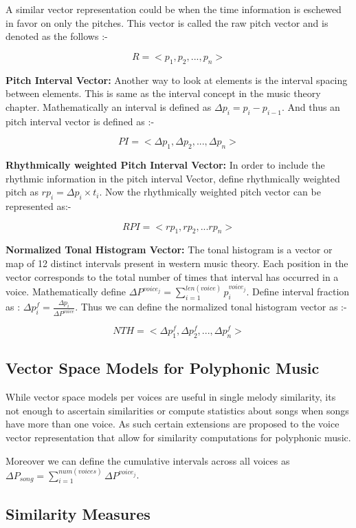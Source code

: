 \noindent A similar vector representation could be when the time information is eschewed in favor on only the pitches. This vector is called the raw pitch vector and is denoted as the follows :-

\begin{equation}
R = <p_1, p_2, ..., p_n>
\end{equation}

\noindent \textbf{Pitch Interval Vector:} Another way to look at elements is the interval spacing between elements. This is same as the interval concept in the music theory chapter. Mathematically an interval is defined as $\Delta p_i = p_i - p_{i-1}$. And thus an pitch interval vector is defined as :-

\begin{equation}
PI = <\Delta p_1, \Delta p_2, ... , \Delta p_n>
\end{equation}

\noindent \textbf{Rhythmically weighted Pitch Interval Vector:} In order to include the rhythmic information in the pitch interval Vector, define rhythmically weighted pitch as $rp_i = \Delta p_i \times t_i$. Now the rhythmically weighted pitch vector can be represented as:-

\begin{equation}
RPI = <rp_1, rp_2, ... rp_n>
\end{equation}

\noindent \textbf{Normalized Tonal Histogram Vector:} The tonal histogram is a vector or map of 12 distinct intervals present in western music theory. Each position in the vector corresponds to the total number of times that interval has occurred in a voice. Mathematically define $\Delta P^{voice_j} = \sum_{i=1}^{len(voice)} p_i^{voice_j}$. Define interval fraction as : $\Delta p^f_i = \frac{\Delta p_i}{\Delta P^{voice}}$. Thus we can define the normalized tonal histogram vector as :-

\begin{equation}
NTH = <\Delta p^f_1, \Delta p^f_2, ... , \Delta p^f_n>
\end{equation}

\subsection{Vector Space Models for Polyphonic Music} 

While vector space models per voices are useful in single melody similarity, its not enough to ascertain similarities or compute statistics about songs when songs have more than one voice. As such certain extensions are proposed to the voice vector representation that allow for similarity computations for polyphonic music.

\noindent Moreover we can define the cumulative intervals across all voices as \\ $\Delta P_{song} = \sum_{i = 1}^{num(voices)} \Delta P^{voice_j}$. 

\subsection{Similarity Measures}